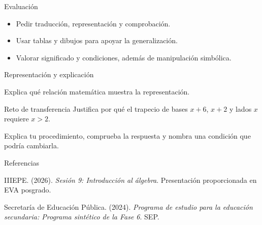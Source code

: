 \documentclass[
	spanish,
	aspectratio=1610,
	xcolor={dvipsnames,table}
]{beamer}
\begin{document}
\begin{frame}{Evaluación}
\fontsize{14}{18}\selectfont\begin{itemize}\setlength{\itemsep}{.45cm}
\item Pedir traducción, representación y comprobación.
\item Usar tablas y dibujos para apoyar la generalización.
\item Valorar significado y condiciones, además de manipulación simbólica.
\end{itemize}
\end{frame}
\begin{frame}{Representación y explicación}
\centering{}\par\vspace{.15cm}\small Explica qué relación matemática muestra la representación.
\end{frame}
\begin{frame}{Reto de transferencia}
\fontsize{14}{18}\selectfont Justifica por qué el trapecio de bases $x+6$, $x+2$ y lados $x$ requiere $x>2$.\par\vspace{.5cm}Explica tu procedimiento, comprueba la respuesta y nombra una condición que podría cambiarla.
\end{frame}
\begin{frame}{Referencias}
\fontsize{9}{11}\selectfont\raggedright 
{\setlength{\parskip}{6pt}
\par\hangindent=1.27cm  IIIEPE. (2026). \textit{Sesión 9: Introducción al álgebra}. Presentación proporcionada en EVA posgrado.
\par\hangindent=1.27cm  Secretaría de Educación Pública. (2024). \textit{Programa de estudio para la educación secundaria: Programa sintético de la Fase 6}. SEP.
}


\end{frame}
\end{document}
